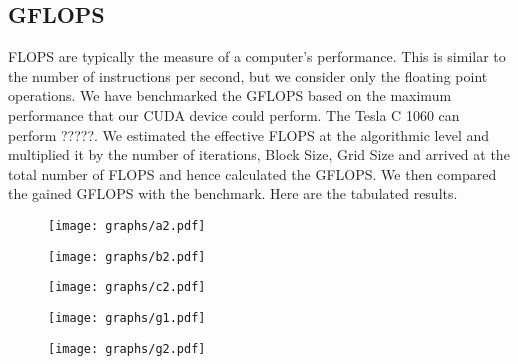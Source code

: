 \documentclass[10pt]{article}
\begin{document}
\begin{multicols}{2}

    \subsection{GFLOPS}
    FLOPS are typically the measure of a computer’s performance.
    This is similar to the number of instructions per second, but we consider only the floating point operations.
    We have benchmarked the GFLOPS based on the maximum performance that our CUDA device could perform.
    The Tesla C 1060 can perform ?????.
    We estimated the effective FLOPS at the algorithmic level and multiplied it by the number of iterations, Block Size, Grid Size and arrived at the total number of FLOPS and hence calculated the GFLOPS.
    We then compared the gained GFLOPS with the benchmark.
    Here are the tabulated results.

    \begin{figure*}
        \centering
        \texttt{[image: graphs/a2.pdf]}
        \caption{}
        \label{fig:gflops1}
    \end{figure*}

    \begin{figure*}
        \centering
        \texttt{[image: graphs/b2.pdf]}
        \caption{}
        \label{fig:gflops2}
    \end{figure*}

    \begin{figure*}
        \centering
        \texttt{[image: graphs/c2.pdf]}
        \caption{}
        \label{fig:gflops3}
    \end{figure*}

    \begin{figure*}
        \centering
        \texttt{[image: graphs/g1.pdf]}
        \caption{}
        \label{fig:jacobi_instr_throughput}
    \end{figure*}

    \begin{figure*}
        \centering
        \texttt{[image: graphs/g2.pdf]}
        \caption{}
        \label{fig:reduction_instr_throughput}
    \end{figure*}


\end{multicols}
\end{document}
